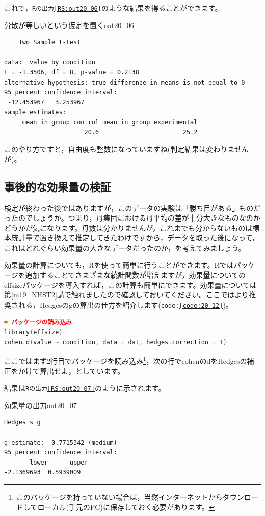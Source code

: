 \documentclass{ltjsbook}
\begin{document}
これで，\texttt{Rの出力\ref{RS:out20_06}}のような結果を得ることができます。

\begin{Rscreen}{分散が等しいという仮定を置く}{out20_06}
	\begin{verbatim}
	Two Sample t-test

data:  value by condition
t = -1.3506, df = 8, p-value = 0.2138
alternative hypothesis: true difference in means is not equal to 0
95 percent confidence interval:
 -12.453967   3.253967
sample estimates:
     mean in group control mean in group experimental 
                      20.6                       25.2 
\end{verbatim}
\end{Rscreen}
このやり方ですと，自由度も整数になっていますね(判定結果は変わりませんが)。

\subsection{事後的な効果量の検証}
検定が終わった後ではありますが，このデータの実験は「勝ち目がある」ものだったのでしょうか。つまり，母集団における母平均の差が十分大きなものなのかどうかが気になります。母数は分かりませんが，これまでも分からないものは標本統計量で置き換えて推定してきたわけですから，データを取った後になって，これはどれぐらい効果量の大きなデータだったのか，を考えてみましょう。

効果量の計算についても，Rを使って簡単に行うことができます。Rではパッケージを追加することでさまざまな統計関数が増えますが，効果量についての\textsf{effsize}パッケージ\parencite{effsize}を導入すれば，この計算も簡単にできます。効果量については第\ref{m19_NHST2}講で触れましたので確認しておいてください。ここではより推奨される，Hedgesのgの算出の仕方を紹介します(\texttt{code:\ref{code:20_12}})。

\begin{lstlisting}[language=c++,label={code:20_12},caption={効果量を求める}]
# パッケージの読み込み
library(effsize)
cohen.d(value ~ condition, data = dat, hedges.correction = T)
\end{lstlisting}
ここではまず2行目でパッケージを読み込み\footnote{このパッケージを持っていない場合は，当然インターネットからダウンロードしてローカル(手元のPC)に保存しておく必要があります。}，次の行でcohenのdをHedgesの補正をかけて算出せよ，としています。

結果は\texttt{Rの出力\ref{RS:out20_07}}のように示されます。
\begin{Rscreen}{効果量の出力}{out20_07}
	\begin{verbatim}
Hedges's g

g estimate: -0.7715342 (medium)
95 percent confidence interval:
       lower      upper 
-2.1369693  0.5939009 
\end{verbatim}
\end{Rscreen}
\end{document}

